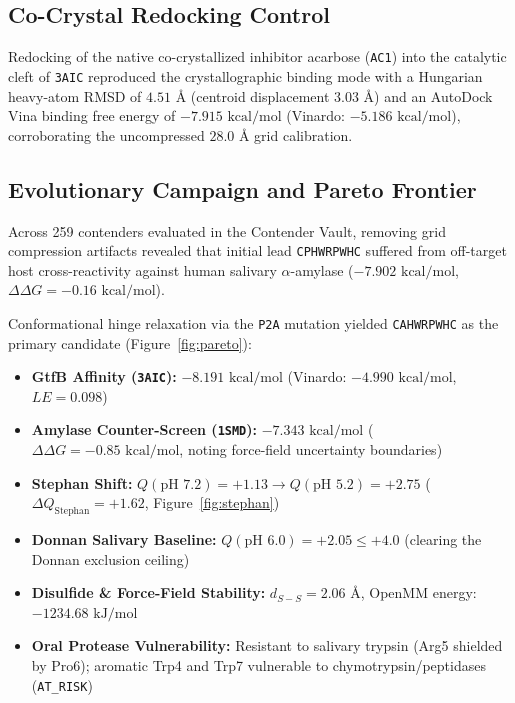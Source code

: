 \documentclass[11pt,a4paper]{article}
\begin{document}
\subsection{Co-Crystal Redocking Control}
Redocking of the native co-crystallized inhibitor acarbose (\texttt{AC1}) into the catalytic cleft of \texttt{3AIC} reproduced the crystallographic binding mode with a Hungarian heavy-atom RMSD of $4.51\text{ \AA}$ (centroid displacement $3.03\text{ \AA}$) and an AutoDock Vina binding free energy of $-7.915\text{ kcal/mol}$ (Vinardo: $-5.186\text{ kcal/mol}$), corroborating the uncompressed $28.0\text{ \AA}$ grid calibration.

\subsection{Evolutionary Campaign and Pareto Frontier}
Across 259 contenders evaluated in the Contender Vault, removing grid compression artifacts revealed that initial lead \texttt{CPHWRPWHC} suffered from off-target host cross-reactivity against human salivary $\alpha$-amylase ($-7.902\text{ kcal/mol}$, $\Delta\Delta G = -0.16\text{ kcal/mol}$). 

Conformational hinge relaxation via the \texttt{P2A} mutation yielded \texttt{CAHWRPWHC} as the primary candidate (Figure~\ref{fig:pareto}):
\begin{itemize}
    \item \textbf{GtfB Affinity (\texttt{3AIC}):} $-8.191\text{ kcal/mol}$ (Vinardo: $-4.990\text{ kcal/mol}$, $LE = 0.098$)
    \item \textbf{Amylase Counter-Screen (\texttt{1SMD}):} $-7.343\text{ kcal/mol}$ ($\Delta\Delta G = -0.85\text{ kcal/mol}$, noting force-field uncertainty boundaries)
    \item \textbf{Stephan Shift:} $Q(\text{pH } 7.2) = +1.13 \rightarrow Q(\text{pH } 5.2) = +2.75$ ($\Delta Q_{\text{Stephan}} = +1.62$, Figure~\ref{fig:stephan})
    \item \textbf{Donnan Salivary Baseline:} $Q(\text{pH } 6.0) = +2.05 \le +4.0$ (clearing the Donnan exclusion ceiling)
    \item \textbf{Disulfide \& Force-Field Stability:} $d_{S-S} = 2.06\text{ \AA}$, OpenMM energy: $-1234.68\text{ kJ/mol}$
    \item \textbf{Oral Protease Vulnerability:} Resistant to salivary trypsin (Arg5 shielded by Pro6); aromatic Trp4 and Trp7 vulnerable to chymotrypsin/peptidases (\texttt{AT\_RISK})
\end{itemize}
\end{document}
